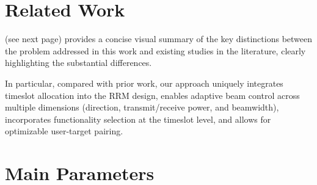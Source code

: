 \documentclass[10pt,journal,compsoc]{IEEEtran}
\theoremstyle{myremark}
\theoremstyle{myexample}
\begin{document}
\begin{appendices}
\section{Related Work} \label{app:related-work}


 (see next page) provides a concise visual summary of the key distinctions between the problem addressed in this work and existing studies in the literature, clearly highlighting the substantial differences.

In particular, compared with prior work, our approach uniquely integrates timeslot allocation into the \gls{RRM} design, enables adaptive beam control across multiple dimensions (direction, transmit/receive power, and beamwidth), incorporates functionality selection at the timeslot level, and allows for optimizable user-target pairing.



\setcounter{equation}{0}
\setcounter{table}{0}
\renewcommand{\theequation}{B.\arabic{equation}}
\renewcommand{\thetable}{B.\arabic{table}}
\section{Main Parameters} \label{app:table-parameters}


\end{appendices}
\end{document}
